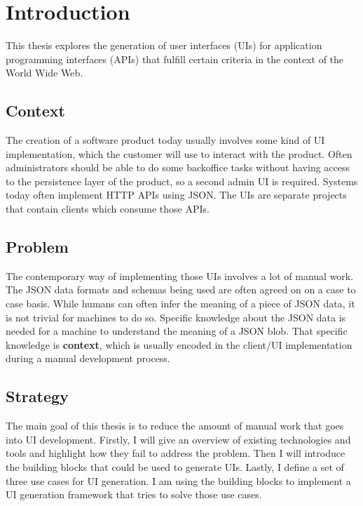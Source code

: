 \section{Introduction}\label{introduction}

This thesis explores the generation of user interfaces (UIs) for application programming interfaces (APIs) that fulfill certain criteria in the context of the World Wide Web.

\subsection{Context}\label{context}
The creation of a software product today usually involves some kind of UI implementation, which the customer will use to interact with the product. Often administrators should be able to do some backoffice tasks without having access to the persistence layer of the product, so a second admin UI is required. Systems today often implement HTTP APIs using JSON. The UIs are separate projects that contain clients which consume those APIs.

\subsection{Problem}\label{problem}
The contemporary way of implementing those UIs involves a lot of manual work. The JSON data formats and schemas being used are often agreed on on a case to case basis. While humans can often infer the meaning of a piece of JSON data, it is not trivial for machines to do so. Specific knowledge about the JSON data is needed for a machine to understand the meaning of a JSON blob. That specific knowledge is \textbf{context}, which is usually encoded in the client/UI implementation during a manual development process.

\subsection{Strategy}\label{strategy}
The main goal of this thesis is to reduce the amount of manual work that goes into UI development. Firstly, I will give an overview of existing technologies and tools and highlight how they fail to address the problem. Then I will introduce the building blocks that could be used to generate UIs. Lastly, I define a set of three use cases for UI generation. I am using the building blocks to implement a UI generation framework that tries to solve those use cases.

